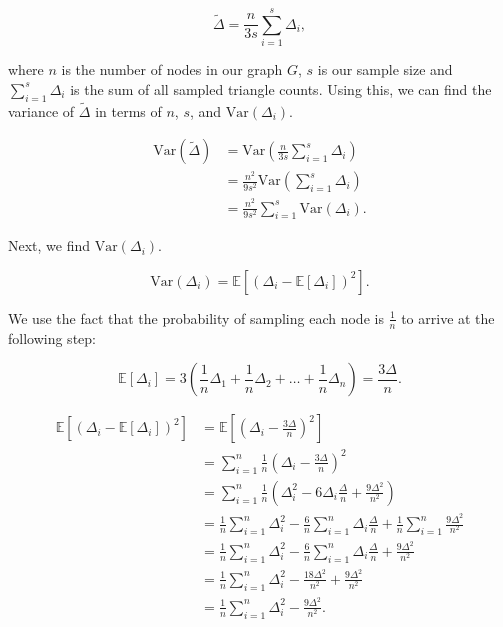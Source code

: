 \documentclass[11pt, margin=1in]{article}
\begin{document}
\[
\tilde{\Delta} = \frac{n}{3s} \sum_{i = 1}^{s} \Delta_i,
\]

where $n$ is the number of nodes in our graph $G$, $s$ is our sample size and $\sum_{i = 1}^{s} \Delta_i$ is the sum of all sampled triangle counts. 
Using this, we can find the variance of $\tilde{\Delta}$ in terms of $n$, $s$, and $\mathrm{Var}\left(\Delta_i\right)$.

\[
\begin{aligned}
\mathrm{Var}\left(\tilde{\Delta}\right) &= \mathrm{Var} \left( \frac{n}{3s} \sum_{i=1}^{s} \Delta_i \right) \\
&= \frac{n^2}{9s^2} \mathrm{Var} \left( \sum_{i=1}^{s} \Delta_i \right) \\
&= \frac{n^2}{9s^2} \sum_{i=1}^{s} \mathrm{Var}\left(\Delta_i\right).
\end{aligned}
\]

Next, we find $\mathrm{Var}\left(\Delta_i\right)$.

\[
\mathrm{Var}\left(\Delta_i\right) = \mathbb{E}\left[\left(\Delta_i - \mathbb{E}[\Delta_i]\right)^2\right].
\]

We use the fact that the probability of sampling each node is $\frac{1}{n}$ to arrive at the following step:

\[
\mathbb{E}\left[\Delta_i\right] = 3\left(\frac{1}{n} \Delta_1 + \frac{1}{n} \Delta_2 + \ldots + \frac{1}{n} \Delta_n\right) = \frac{3\Delta}{n}.
\]

\[
\begin{aligned}
\mathbb{E}\left[\left(\Delta_i - \mathbb{E}\left[\Delta_i\right]\right)^2\right] &= \mathbb{E}\left[\left(\Delta_i - \frac{3\Delta}{n}\right)^2\right] \\
&= \sum_{i = 1}^{n} \frac{1}{n} \left(\Delta_i - \frac{3\Delta}{n}\right)^2 \\
&= \sum_{i = 1}^{n} \frac{1}{n} \left(\Delta_i^2 - 6 \Delta_i \frac{\Delta}{n} + \frac{9\Delta^2}{n^2}\right) \\
&= \frac{1}{n} \sum_{i = 1}^{n} \Delta_i^2 - \frac{6}{n} \sum_{i = 1}^{n} \Delta_i \frac{\Delta}{n} + \frac{1}{n} \sum_{i = 1}^{n} \frac{9\Delta^2}{n^2} \\
&= \frac{1}{n} \sum_{i = 1}^{n} \Delta_i^2 - \frac{6}{n} \sum_{i = 1}^{n} \Delta_i \frac{\Delta}{n} + \frac{9\Delta^2}{n^2} \\
&= \frac{1}{n} \sum_{i = 1}^{n} \Delta_i^2 - \frac{18\Delta^2}{n^2} + \frac{9\Delta^2}{n^2} \\
&= \frac{1}{n} \sum_{i = 1}^{n} \Delta_i^2 - \frac{9\Delta^2}{n^2}.
\end{aligned}
\]
\end{document}

